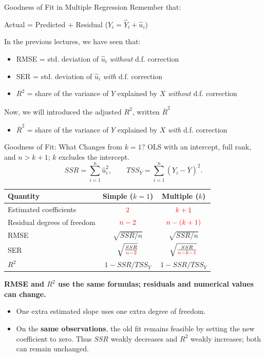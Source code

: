 \documentclass[notes,10pt, aspectratio=169]{beamer}
\begin{document}
\begin{frame}{Goodness of Fit in Multiple Regression}
Remember that:
\begin{center}
    Actual = Predicted + Residual ($Y_i= \hat{Y}_i+\hat{u}_i$)
\end{center}
In the previous lectures, we have seen that:

\begin{itemize}
    \item RMSE = std. deviation of $\hat{u}_i$ \textit{without} d.f. correction
    \item SER = std. deviation of $\hat{u}_i$ \textit{with} d.f. correction
    \item $R^2$ = share of the variance of $Y$ explained by $X$ \textit{without} d.f. correction
\end{itemize}
Now, we will introduced the adjusted $R^2$, written $\overline{R}^2$
\begin{itemize}
    \item[$\Rightarrow$] $\overline{R}^2$ = share of the variance of $Y$ explained by $X$ \textit{with} d.f. correction
\end{itemize}
\end{frame}

\begin{frame}{Goodness of Fit: What Changes from $k=1$?}
\small
OLS with an intercept, full rank, and $n>k+1$; $k$ excludes the intercept.
\[
    SSR=\sum_{i=1}^n\hat{u}_i^2,
    \qquad TSS_Y=\sum_{i=1}^n(Y_i-\bar{Y})^2.
\]
\vspace{-0.5em}
\begin{center}
\renewcommand{\arraystretch}{1.35}
\begin{tabular}{lcc}
\toprule
Quantity & Simple ($k=1$) & Multiple ($k$) \\
\midrule
Estimated coefficients & $\textcolor{red}{2}$ & $\textcolor{red}{k+1}$ \\
Residual degrees of freedom & $\textcolor{red}{n-2}$ & $\textcolor{red}{n-(k+1)}$ \\
RMSE & $\sqrt{SSR/n}$ & $\sqrt{SSR/n}$ \\
SER & $\sqrt{\frac{SSR}{\textcolor{red}{n-2}}}$ & $\sqrt{\frac{SSR}{\textcolor{red}{n-k-1}}}$ \\
$R^2$ & $1-SSR/TSS_Y$ & $1-SSR/TSS_Y$ \\
\bottomrule
\end{tabular}
\end{center}
\textbf{RMSE and $R^2$ use the same formulas; residuals and numerical values can change.}
\begin{itemize}
    \item One extra estimated slope uses one extra degree of freedom.
    \item On the \textbf{same observations}, the old fit remains feasible by setting the new coefficient to zero. Thus $SSR$ weakly decreases and $R^2$ weakly increases; both can remain unchanged.
\end{itemize}
\end{frame}
\end{document}
